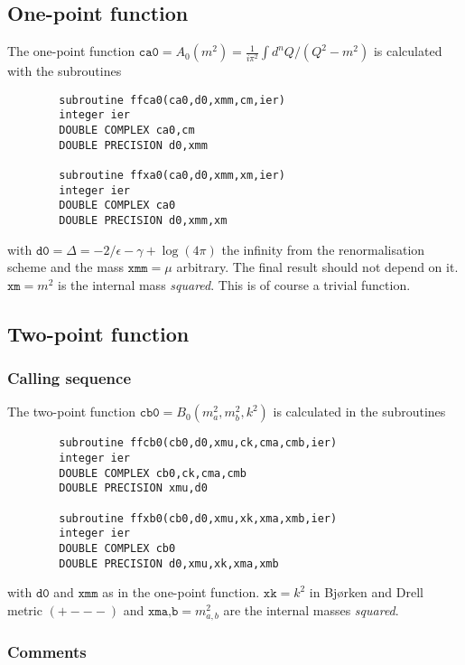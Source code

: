 \documentclass[twoside,12pt]{report}
\def\Code#1{\ensuremath{\texttt{#1}}}
\begin{document}
\begin{appendix}

\subsection{One-point function}

The one-point function $\Code{ca0} = A_0(m^2) = \frac{1}{i\pi^2}\int d^n 
Q/(Q^2-m^2)$ is calculated with the subroutines
\begin{verbatim}
        subroutine ffca0(ca0,d0,xmm,cm,ier)
        integer ier
        DOUBLE COMPLEX ca0,cm
        DOUBLE PRECISION d0,xmm

        subroutine ffxa0(ca0,d0,xmm,xm,ier)
        integer ier
        DOUBLE COMPLEX ca0
        DOUBLE PRECISION d0,xmm,xm
\end{verbatim}
with $\Code{d0} = \Delta = -2/\epsilon - \gamma + \log(4\pi) $ the 
infinity from the renormalisation scheme and the mass $\Code{xmm} = \mu$ 
arbitrary.  The final result should not depend on it.  $\Code{xm} = m^2$ 
is the internal mass {\em squared}.  This is of course a trivial function.

\subsection{Two-point function}

\subsubsection{Calling sequence}

The two-point function $\Code{cb0} = B_0(m_a^2,m_b^2,k^2)$ is calculated 
in the subroutines
\begin{verbatim}
        subroutine ffcb0(cb0,d0,xmu,ck,cma,cmb,ier)
        integer ier
        DOUBLE COMPLEX cb0,ck,cma,cmb
        DOUBLE PRECISION xmu,d0

        subroutine ffxb0(cb0,d0,xmu,xk,xma,xmb,ier)
        integer ier
        DOUBLE COMPLEX cb0
        DOUBLE PRECISION d0,xmu,xk,xma,xmb
\end{verbatim}
with \Code{d0} and \Code{xmm} as in the one-point function. $\Code{xk} = 
k^2$ in Bj{\o}rken and Drell metric {\small $(+---)$} and $\Code{xma,b} = 
m_{a,b}^2$ are the internal masses {\em squared}.  

\subsubsection{Comments}


\end{appendix}
\end{document}

